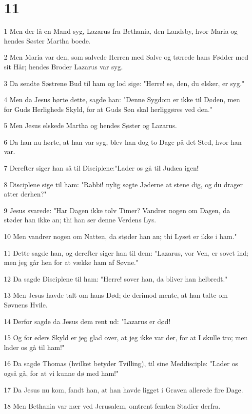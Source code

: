 \chapter{11}

\par 1 Men der lå en Mand syg, Lazarus fra Bethania, den Landsby, hvor Maria og hendes Søster Martha boede.
\par 2 Men Maria var den, som salvede Herren med Salve og tørrede hans Fødder med sit Hår; hendes Broder Lazarus var syg.
\par 3 Da sendte Søstrene Bud til ham og lod sige: "Herre! se, den, du elsker, er syg."
\par 4 Men da Jesus hørte dette, sagde han: "Denne Sygdom er ikke til Døden, men for Guds Herligheds Skyld, for at Guds Søn skal herliggøres ved den."
\par 5 Men Jesus elskede Martha og hendes Søster og Lazarus.
\par 6 Da han nu hørte, at han var syg, blev han dog to Dage på det Sted, hvor han var.
\par 7 Derefter siger han så til Disciplene:"Lader os gå til Judæa igen!
\par 8 Disciplene sige til ham: "Rabbi! nylig søgte Jøderne at stene dig, og du drager atter derhen?"
\par 9 Jesus svarede: "Har Dagen ikke tolv Timer? Vandrer nogen om Dagen, da støder han ikke an; thi han ser denne Verdens Lys.
\par 10 Men vandrer nogen om Natten, da støder han an; thi Lyset er ikke i ham."
\par 11 Dette sagde han, og derefter siger han til dem: "Lazarus, vor Ven, er sovet ind; men jeg går hen for at vække ham af Søvne."
\par 12 Da sagde Disciplene til ham: "Herre! sover han, da bliver han helbredt."
\par 13 Men Jesus havde talt om hans Død; de derimod mente, at han talte om Søvnens Hvile.
\par 14 Derfor sagde da Jesus dem rent ud: "Lazarus er død!
\par 15 Og for eders Skyld er jeg glad over, at jeg ikke var der, for at I skulle tro; men lader os gå til ham!"
\par 16 Da sagde Thomas (hvilket betyder Tvilling), til sine Meddisciple: "Lader os også gå, for at vi kunne dø med ham!"
\par 17 Da Jesus nu kom, fandt han, at han havde ligget i Graven allerede fire Dage.
\par 18 Men Bethania var nær ved Jerusalem, omtrent femten Stadier derfra.
